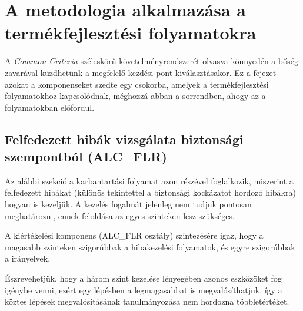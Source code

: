 \chapter{A metodologia alkalmazása a termékfejlesztési folyamatokra}

A \emph{Common Criteria} széleskörű követelményrendszerét olvasva könnyedén a bőség zavarával
küzdhetünk a megfelelő kezdési pont kiválasztásakor. Ez a fejezet azokat a komponenseket szedte egy
csokorba, amelyek a termékfejlesztési folyamatokhoz kapcsolódnak, méghozzá abban a sorrendben, ahogy
az a folyamatokban előfordul.

\section{Felfedezett hibák vizsgálata biztonsági szempontból (ALC\_FLR)}

Az alábbi szekció a karbantartási folyamat azon részével foglalkozik, miszerint a felfedezett
hibákat (különös tekintettel a biztonsági kockázatot hordozó hibákra) hogyan is kezeljük. A kezelés
fogalmát jelenleg nem tudjuk pontosan meghatározni, ennek feloldása az egyes szinteken lesz
szükséges.

A kiértékelési komponens (ALC\_FLR osztály) szintezésére igaz, hogy a magasabb szinteken
szigorúbbak a hibakezelési folyamatok, és egyre szigorúbbak a irányelvek.

Észrevehetjük, hogy a három szint kezelése lényegében azonos eszközöket fog igénybe venni, ezért egy
lépésben a legmagasabbat is megvalósíthatjuk, így a köztes lépések megvalósításának tanulmányozása
nem hordozna többletértéket.

